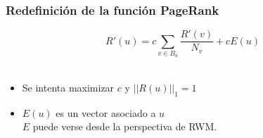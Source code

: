 \documentclass[
10pt, %
aspectratio=169, %
]{beamer}
\begin{document}
	\begin{frame}
		
		\frametitle{Redefinición de la función PageRank}
		
		$$R'(u) = c \sum_{v \in B_u} \frac{R'(v)}{N_v} + cE(u)$$ \\[2mm] 
		
		\begin{itemize}
			
			\item Se intenta maximizar $c$ y $||R(u)||_1 = 1$
			
			\item $E(u)$ es un vector asociado a $u$\\
			$E$ puede verse desde la perspectiva de RWM.
			
		\end{itemize}

	\end{frame}
	
\end{document}
